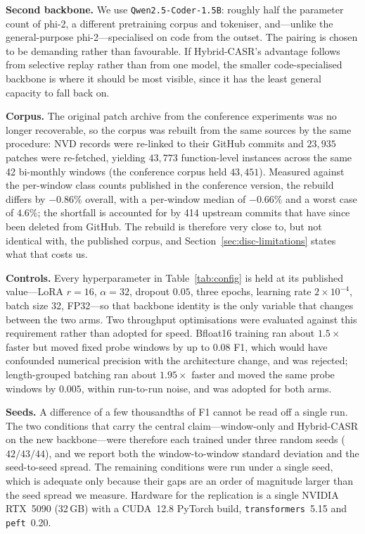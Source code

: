 \textbf{Second backbone.} We use \texttt{Qwen2.5-Coder-1.5B}: roughly half the parameter count of phi-2, a different pretraining corpus and tokeniser, and---unlike the general-purpose phi-2---specialised on code from the outset. The pairing is chosen to be demanding rather than favourable. If Hybrid-CASR's advantage follows from selective replay rather than from one model, the smaller code-specialised backbone is where it should be most visible, since it has the least general capacity to fall back on.

\textbf{Corpus.} The original patch archive from the conference experiments was no longer recoverable, so the corpus was rebuilt from the same sources by the same procedure: NVD records were re-linked to their GitHub commits and $23{,}935$ patches were re-fetched, yielding $43{,}773$ function-level instances across the same 42 bi-monthly windows (the conference corpus held $43{,}451$). Measured against the per-window class counts published in the conference version, the rebuild differs by $-0.86\%$ overall, with a per-window median of $-0.66\%$ and a worst case of $4.6\%$; the shortfall is accounted for by 414 upstream commits that have since been deleted from GitHub. The rebuild is therefore very close to, but not identical with, the published corpus, and Section~\ref{sec:disc-limitations} states what that costs us.

\textbf{Controls.} Every hyperparameter in Table~\ref{tab:config} is held at its published value---LoRA $r=16$, $\alpha=32$, dropout $0.05$, three epochs, learning rate $2\times10^{-4}$, batch size 32, FP32---so that backbone identity is the only variable that changes between the two arms. Two throughput optimisations were evaluated against this requirement rather than adopted for speed. Bfloat16 training ran about $1.5\times$ faster but moved fixed probe windows by up to $0.08$ F1, which would have confounded numerical precision with the architecture change, and was rejected; length-grouped batching ran about $1.95\times$ faster and moved the same probe windows by $0.005$, within run-to-run noise, and was adopted for both arms.

\textbf{Seeds.} A difference of a few thousandths of F1 cannot be read off a single run. The two conditions that carry the central claim---window-only and Hybrid-CASR on the new backbone---were therefore each trained under three random seeds ($42/43/44$), and we report both the window-to-window standard deviation and the seed-to-seed spread. The remaining conditions were run under a single seed, which is adequate only because their gaps are an order of magnitude larger than the seed spread we measure. Hardware for the replication is a single NVIDIA RTX~5090 (32\,GB) with a CUDA~12.8 PyTorch build, \texttt{transformers}~5.15 and \texttt{peft}~0.20.

